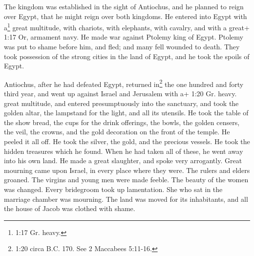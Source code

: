  The kingdom was established in the sight of Antiochus, and
he planned to reign over Egypt, that he might reign over both kingdoms.
 He entered into Egypt with a\footnote{1:17 Gr. heavy.}
great multitude, with chariots, with elephants, with cavalry, and with a
great+ 1:17 Or, armament navy.  He made war against Ptolemy
king of Egypt. Ptolemy was put to shame before him, and fled; and many
fell wounded to death.  They took possession of the strong
cities in the land of Egypt, and he took the spoils of Egypt.

 Antiochus, after he had defeated Egypt, returned
in\footnote{1:20 circa B.C. 170. See 2 Maccabees 5:11-16.} the one
hundred and forty third year, and went up against Israel and Jerusalem
with a+ 1:20 Gr. heavy. great multitude,  and entered
presumptuously into the sanctuary, and took the golden altar, the
lampstand for the light, and all its utensils.  He took the
table of the show bread, the cups for the drink offerings, the bowls,
the golden censers, the veil, the crowns, and the gold decoration on the
front of the temple. He peeled it all off.  He took the
silver, the gold, and the precious vessels. He took the hidden treasures
which he found.  When he had taken all of these, he went
away into his own land. He made a great slaughter, and spoke very
arrogantly.  Great mourning came upon Israel, in every
place where they were.  The rulers and elders groaned. The
virgins and young men were made feeble. The beauty of the women was
changed.  Every bridegroom took up lamentation. She who sat
in the marriage chamber was mourning.  The land was moved
for its inhabitants, and all the house of Jacob was clothed with shame.

